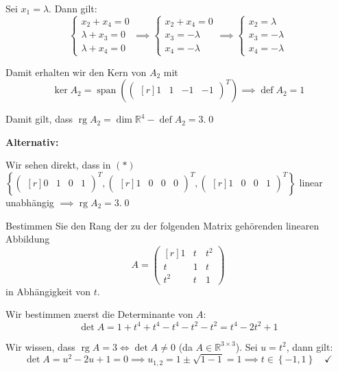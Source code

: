 \documentclass[answers]{exam}
\newcommand{\vektor}[1]{\begin{pmatrix*}[r] #1 \end{pmatrix*}}
\renewcommand{\span}[1]{\operatorname{span}\left(#1\right)}
\newcommand{\R}{\mathbb{R}}
\DeclareMathOperator{\defect}{def}
\DeclareMathOperator{\rg}{rg}
\begin{document}
\begin{questions}
\begin{parts}
\begin{solution}
            Sei $x_1 = \lambda$.
            Dann gilt:
            $$
                \begin{cases}
                    x_2 + x_4 = 0     \\
                    \lambda + x_3 = 0 \\
                    \lambda + x_4 = 0
                \end{cases}
                \implies
                \begin{cases}
                    x_2 + x_4 = 0  \\
                    x_3 = -\lambda \\
                    x_4 = -\lambda
                \end{cases}
                \implies
                \begin{cases}
                    x_2 = \lambda  \\
                    x_3 = -\lambda \\
                    x_4 = -\lambda
                \end{cases}
            $$

            Damit erhalten wir den Kern von $A_2$ mit
            $$
                \ker A_2 = \span{\vektor{1 & 1 & -1 & -1}^T} \implies \defect A_2 = 1
            $$

            Damit gilt, dass $\rg A_2 = \dim \R^4 - \defect A_2 = 3$.\qed

            \vspace{2em}
            \textbf{Alternativ:}

            Wir sehen direkt, dass in $(*)$ $\left\{\vektor{0 & 1 & 0 & 1}^T, \vektor{1 & 0 & 0 & 0}^T, \vektor{1 & 0 & 0 & 1}^T\right\}$ linear unabhängig $\implies \rg A_2 = 3$.\qed
        \end{solution}
    \end{parts}

    \newpage

    \question
    Bestimmen Sie den Rang der zu der folgenden Matrix gehörenden linearen Abbildung
    $$
        A = \vektor{1 & t & t^2 \\ t & 1 & t \\ t^2 & t & 1}
    $$
    in Abhängigkeit von $t$.
    \begin{solution}
        Wir bestimmen zuerst die Determinante von $A$:
        $$
            \det A = 1 + t^4 + t^4 - t^4 -t^2-t^2 = t^4 - 2t^2 + 1
        $$

        Wir wissen, dass $\rg A = 3 \iff \det A \neq 0$ (da $A \in \R^{3\times 3}$). Sei $u = t^2$, dann gilt:
        $$
            \det A = u^2 - 2u + 1 = 0 \implies u_{1,2} = 1 \pm \sqrt{1 - 1} = 1 \implies t \in \left\{-1, 1\right\} \quad \checkmark
        $$


\end{solution}
\end{questions}
\end{document}
